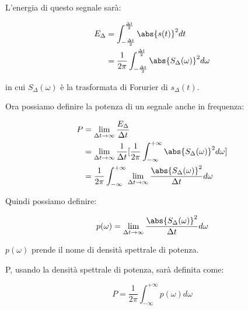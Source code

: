L'energia di questo segnale sarà: 

{
    \Large 
    \begin{equation}
        \begin{split}
            E_\Delta 
            &= 
            \int_{- \frac{\Delta t}{2}}^{\frac{\Delta t}{2}}
            \abs{s(t)} ^{2} dt 
            \\ 
            &= \frac{1}{2 \pi} 
            \int_{- \frac{\Delta t}{2}}^{\frac{\Delta t}{2}}
            \abs{S_\Delta (\omega)} ^{2} d\omega 
        \end{split}
    \end{equation}
}

in cui $S_\Delta (\omega)$ è la trasformata di Forurier di $s_\Delta (t)$. \newline 

Ora possiamo definire la potenza di un segnale anche in frequenza: 

{
    \Large 
    \begin{equation}
        \begin{split}
            P 
            &= 
            \lim_{\Delta t \rightarrow \infty}
            \frac{E_\Delta}{\Delta t} 
            \\ 
            &= 
            \lim_{\Delta t \rightarrow \infty}
            \frac{1}{\Delta t} 
            [\frac{1}{2 \pi} \int_{- \infty}^{+ \infty} 
            \abs{S_\Delta (\omega)}^{2} d\omega]
            \\ 
            &= 
            \frac{1}{2 \pi} 
            \int_{- \infty}^{+ \infty}
            \lim_{\Delta t \rightarrow \infty} 
            \frac{\abs{S_\Delta (\omega)}^{2}}{\Delta t} d\omega
        \end{split}
    \end{equation}
}

Quindi possiamo definire: 

{
    \Large 
    \begin{equation}
        p(\omega) 
        = 
        \lim_{\Delta t \rightarrow \infty} 
        \frac{\abs{S_\Delta (\omega)}^{2}}{\Delta t} d\omega
    \end{equation}
}

$p(\omega)$ prende il nome di densità spettrale di potenza. \newline 

P, usando la densità spettrale di potenza, sarà definita come: 

{
    \Large 
    \begin{equation}
        P 
        = 
        \frac{1}{2 \pi}
        \int_{-\infty}^{+ \infty}
        p(\omega) d\omega 
    \end{equation}
}

